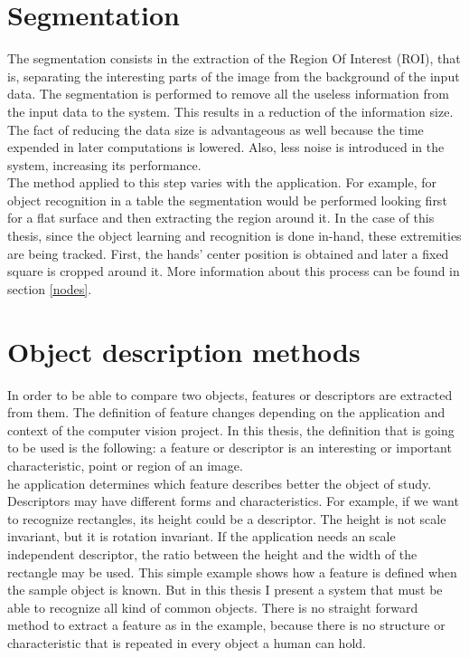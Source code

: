 \section{Segmentation}
\label{segmentation}
The segmentation consists in the extraction of the Region Of Interest (ROI), that is, separating the interesting parts of the image from the background of the input data. 
The segmentation is performed to remove all the useless information from the input data to the system. 
This results in a reduction of the information size. 
The fact of reducing the data size is advantageous as well because the time expended in later computations is lowered. 
Also, less noise is introduced in the system, increasing its performance. 
\\

The method applied to this step varies with the application. 
For example, for object recognition in a table the segmentation would be performed looking first for a flat surface and then extracting the region around it. 
In the case of this thesis, since the object learning and recognition is done in-hand, these extremities are being tracked. 
First, the hands' center position is obtained and later a fixed square is cropped around it. 
More information about this process can be found in section \ref{nodes}.



\section{Object description methods}
\label{descriptors}
In order to be able to compare two objects, features or descriptors are extracted from them. 
The definition of feature changes depending on the application and context of the computer vision project. In this thesis, the definition that is going to be used is the following:
a feature or descriptor is an interesting or important characteristic, point or region of an image. 
\\

he application determines which feature describes better the object of study. 
Descriptors may have different forms and characteristics. 
For example, if we want to recognize rectangles, its height could be a descriptor.
The height is not scale invariant, but it is rotation invariant. 
If the application needs an scale independent descriptor, the ratio between the height and the width of the rectangle may be used. 
This simple example shows how a feature is defined when the sample object is known. 
But in this thesis I present a system that must be able to recognize all kind of common objects. 
There is no straight forward method to extract a feature as in the example, because there is no structure or characteristic that is repeated in every object a human can hold. 
\\

